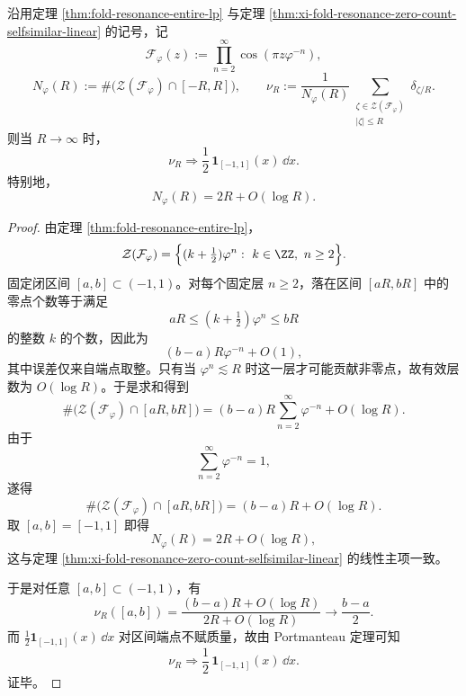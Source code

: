 \begin{theorem}\label{thm:xi-fold-resonance-scaled-zero-measure-uniform}
沿用定理 \ref{thm:fold-resonance-entire-lp} 与定理 \ref{thm:xi-fold-resonance-zero-count-selfsimilar-linear} 的记号，记
\[
\mathcal F_\varphi(z):=\prod_{n=2}^{\infty}\cos(\pi z\varphi^{-n}),
\]
\[
N_\varphi(R):=\#\bigl(\mathcal Z(\mathcal F_\varphi)\cap[-R,R]\bigr),
\qquad
\nu_R:=\frac{1}{N_\varphi(R)}\sum_{\substack{\zeta\in\mathcal Z(\mathcal F_\varphi)\\ |\zeta|\le R}}\delta_{\zeta/R}.
\]
则当 \(R\to\infty\) 时，
\[
\boxed{\;
\nu_R \Longrightarrow \frac12\,\mathbf 1_{[-1,1]}(x)\,\dd x.
\;}
\]
特别地，
\[
\boxed{\;
N_\varphi(R)=2R+O(\log R).\;}
\]
\end{theorem}
\begin{proof}
由定理 \ref{thm:fold-resonance-entire-lp}，
\[
\mathcal Z(\mathcal F_\varphi)
=
\Bigl\{(k+\tfrac12)\varphi^n:\ k\in\ZZ,\ n\ge 2\Bigr\}.
\]
固定闭区间 \([a,b]\subset(-1,1)\)。对每个固定层 \(n\ge 2\)，落在区间 \([aR,bR]\) 中的零点个数等于满足
\[
aR\le (k+\tfrac12)\varphi^n\le bR
\]
的整数 \(k\) 的个数，因此为
\[
(b-a)R\varphi^{-n}+O(1),
\]
其中误差仅来自端点取整。只有当 \(\varphi^n\lesssim R\) 时这一层才可能贡献非零点，故有效层数为 \(O(\log R)\)。于是求和得到
\[
\#\bigl(\mathcal Z(\mathcal F_\varphi)\cap[aR,bR]\bigr)
=
(b-a)R\sum_{n=2}^{\infty}\varphi^{-n}+O(\log R).
\]
由于
\[
\sum_{n=2}^{\infty}\varphi^{-n}=1,
\]
遂得
\[
\#\bigl(\mathcal Z(\mathcal F_\varphi)\cap[aR,bR]\bigr)
=
(b-a)R+O(\log R).
\]
取 \([a,b]=[-1,1]\) 即得
\[
N_\varphi(R)=2R+O(\log R),
\]
这与定理 \ref{thm:xi-fold-resonance-zero-count-selfsimilar-linear} 的线性主项一致。

于是对任意 \([a,b]\subset(-1,1)\)，有
\[
\nu_R([a,b])
=
\frac{(b-a)R+O(\log R)}{2R+O(\log R)}
\longrightarrow
\frac{b-a}{2}.
\]
而 \(\frac12\mathbf 1_{[-1,1]}(x)\,\dd x\) 对区间端点不赋质量，故由 Portmanteau 定理可知
\[
\nu_R \Longrightarrow \frac12\,\mathbf 1_{[-1,1]}(x)\,\dd x.
\]
证毕。
\end{proof}

